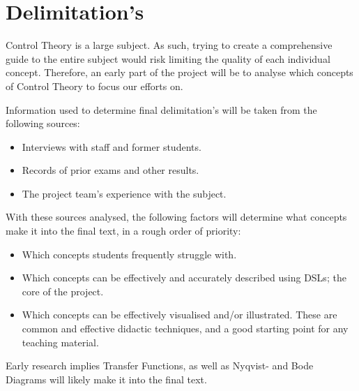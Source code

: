 \section{Delimitation's}\label{sec:delimitation}
Control Theory is a large subject. As such, trying to create a comprehensive guide to the entire subject would risk limiting the quality of each individual concept. Therefore, an early part of the project will be to analyse which concepts of Control Theory to focus our efforts on.

Information used to determine final delimitation's will be taken from the following sources:
\begin{itemize}
    \item Interviews with staff and former students.
    \item Records of prior exams and other results.
    \item The project team's experience with the subject.
\end{itemize}

With these sources analysed, the following factors will determine what concepts make it into the final text, in a rough order of priority:
\begin{itemize}
    \item Which concepts students frequently struggle with.
    \item Which concepts can be effectively and accurately described using DSLs\cite{DAT326}; the core of the project.
    \item Which concepts can be effectively visualised and/or illustrated. These are common and effective didactic techniques, and a good starting point for any teaching material.
\end{itemize}

Early research implies Transfer Functions, as well as Nyqvist- and Bode Diagrams will likely make it into the final text.

\iffalse
Avgränsningar: (slids)

Avgränsningarna ska ta upp vilka delar av det övergripande syftet som inte tas upp i arbetet, och anledningarna till detta. (Kan ingå i problem-/uppgiftsanalysen)


\fi